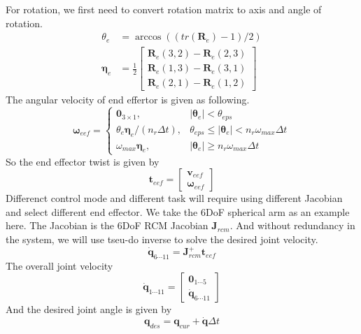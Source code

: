 \documentclass{article}
\begin{document}
For rotation, we first need to convert rotation matrix to axis and angle of rotation.
\begin{equation}
\begin{split}
\theta_e & =\arccos((tr(\mathbf{R}_e)-1)/2)\\
\boldsymbol{\eta}_e &= \frac{1}{2}\begin{bmatrix} \mathbf{R}_e(3,2) - \mathbf{R}_e(2,3) \\ \mathbf{R}_e(1,3) - \mathbf{R}_e(3,1) \\ \mathbf{R}_e(2,1) - \mathbf{R}_e(1,2) \end{bmatrix}
\end{split}
\end{equation}
The angular velocity of end effertor is given as following.
\begin{equation}
\boldsymbol{\omega}_{eef} = \left\{\begin{matrix}
\mathbf{0}_{3\times1}, & |\boldsymbol{\theta}_{e} | < \theta_{eps} \\ 
\theta_e \boldsymbol{\eta}_e / (n_r \Delta t), &  \theta_{eps} \leqslant |\boldsymbol{\theta}_{e}| < n_r \omega_{max} \Delta t\\ 
\omega_{max} \boldsymbol{\eta}_e, & |\boldsymbol{\theta}_{e}| \geqslant n_r \omega_{max} \Delta t
\end{matrix}\right.
\end{equation}
So the end effector twist is given by
\begin{equation}
\mathbf{t}_{eef} = \begin{bmatrix} \mathbf{v}_{eef} \\ \boldsymbol{\omega}_{eef} \end{bmatrix}
\end{equation}
Differenct control mode and different task will require using different Jacobian and select different end effector. We take the 6DoF spherical arm as an example here. The Jacobian is the 6DoF RCM Jacobian $\mathbf{J}_{rcm}$. And without redundancy in the system, we will use tseu-do inverse to solve the desired joint velocity.
\begin{equation}
\dot{\mathbf{q}}_{6\cdots11} = \mathbf{J}_{rcm}^+ \mathbf{t}_{eef}
\end{equation}
The overall joint velocity
\begin{equation}
\dot{\mathbf{q}}_{1\cdots11} = \begin{bmatrix}\mathbf{0}_{1\cdots5} \\ \dot{\mathbf{q}}_{6\cdots11} \end{bmatrix}
\end{equation}
And the desired joint angle is given by
\begin{equation}
\mathbf{q}_{des} = \mathbf{q}_{cur} + \dot{\mathbf{q}} \Delta t
\end{equation}
\end{document}
